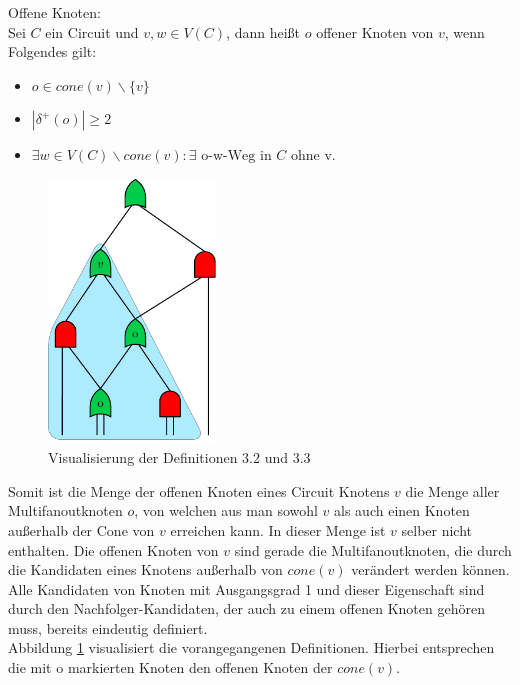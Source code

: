 \documentclass[11pt, a4paper, german]{article}
\begin{document}
\begin{definition}{Offene Knoten:}\\
	Sei $C$ ein Circuit und $v,w \in V(C)$, dann heißt $o$ offener Knoten von $v$, wenn Folgendes gilt: 
	\begin{itemize}
		\item $ o \in cone(v)\backslash \{ v \} $
		\item $| \delta ^{+}(o)| \geq 2$
		\item $ \exists w \in V(C) \backslash cone(v) : \exists \text{ o-w-Weg in } C \text{ ohne v} $.
	\end{itemize}	
\end{definition}
 \begin{figure}
		\includegraphics[height = 7cm]{pictures/compiled/cone}
		\caption{Visualisierung der Definitionen 3.2 und 3.3}
		\label{bild:cone}
\end{figure}
Somit ist die Menge der offenen Knoten eines Circuit Knotens $v$ die Menge aller Multifanoutknoten $o$, von welchen aus man sowohl $v$ als auch einen Knoten außerhalb der Cone von $v$ erreichen kann. In dieser Menge ist $v$ selber nicht enthalten. Die offenen Knoten von $v$ sind gerade die Multifanoutknoten, die durch die Kandidaten eines Knotens außerhalb von $cone(v)$ verändert werden können. Alle Kandidaten von  Knoten mit Ausgangsgrad 1 und dieser Eigenschaft sind durch den Nachfolger-Kandidaten, der auch zu einem offenen Knoten gehören muss, bereits eindeutig definiert. \\
Abbildung \ref{bild:cone} visualisiert die vorangegangenen Definitionen. Hierbei entsprechen die  mit o markierten Knoten den offenen Knoten der $cone(v)$.
\end{document}
